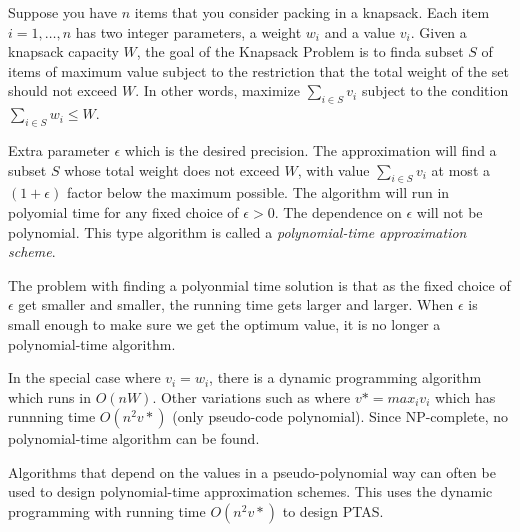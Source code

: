 \documentclass{proc}
\begin{document}
\begin{mdframed}
    Suppose you have $n$ items that you consider packing in a knapsack. Each item $i = 1, \ldots, n$ has two integer parameters, a weight $w_i$ and a value $v_i$. Given a knapsack capacity $W$, the goal of the Knapsack Problem is to finda subset $S$ of items of maximum value subject to the restriction that the total weight of the set should not exceed $W$. In other words, maximize $\sum_{i \in S} v_i$ subject to the condition $\sum_{i \in S} w_i \le W$.
    
    Extra parameter $\epsilon$ which is the desired precision. The approximation will find a subset $S$ whose total weight does not exceed $W$, with value $\sum_{i \in S} v_i$ at most a $(1 + \epsilon)$ factor below the maximum possible. 
    The algorithm will run in polyomial time for any fixed choice of $\epsilon > 0$. The dependence on $\epsilon$ will not be polynomial. This type algorithm is called a \textit{polynomial-time approximation scheme}.
\end{mdframed}

The problem with finding a polyonmial time solution is that as the fixed choice of $\epsilon$ get smaller and smaller, the running time gets larger and larger. When $\epsilon$ is small enough to make sure we get the optimum value, it is no longer a polynomial-time algorithm.

In the special case where $v_i = w_i$, there is a dynamic programming algorithm which runs in $O(nW)$. Other variations such as where $v* = max_i v_i$ which has runnning time $O(n^2 v*)$ (only pseudo-code polynomial). Since NP-complete, no polynomial-time algorithm can be found.

Algorithms that depend on the values in a pseudo-polynomial way can often be used to design polynomial-time approximation schemes. This uses the dynamic programming with running time $O(n^2 v*)$ to design PTAS.
\end{document}
